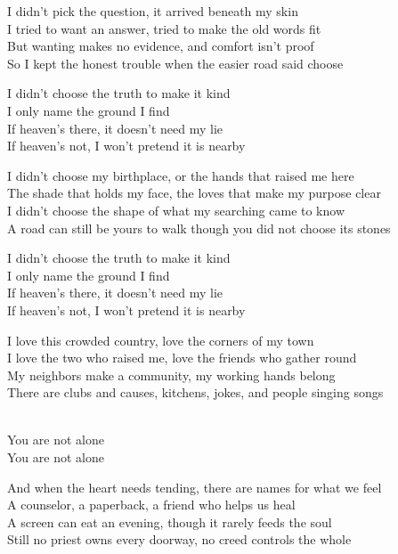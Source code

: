 \begin{lyrics}
I didn't pick the question, it arrived beneath my skin\\
I tried to want an answer, tried to make the old words fit\\
But wanting makes no evidence, and comfort isn't proof\\
So I kept the honest trouble when the easier road said choose

I didn't choose the truth to make it kind\\
I only name the ground I find\\
If heaven's there, it doesn't need my lie\\
If heaven's not, I won't pretend it is nearby

I didn't choose my birthplace, or the hands that raised me here\\
The shade that holds my face, the loves that make my purpose clear\\
I didn't choose the shape of what my searching came to know\\
A road can still be yours to walk though you did not choose its stones

I didn't choose the truth to make it kind\\
I only name the ground I find\\
If heaven's there, it doesn't need my lie\\
If heaven's not, I won't pretend it is nearby

I love this crowded country, love the corners of my town\\
I love the two who raised me, love the friends who gather round\\
My neighbors make a community, my working hands belong\\
There are clubs and causes, kitchens, jokes, and people singing songs

\\
You are not alone\\
You are not alone

And when the heart needs tending, there are names for what we feel\\
A counselor, a paperback, a friend who helps us heal\\
A screen can eat an evening, though it rarely feeds the soul\\
Still no priest owns every doorway, no creed controls the whole


\end{lyrics}

